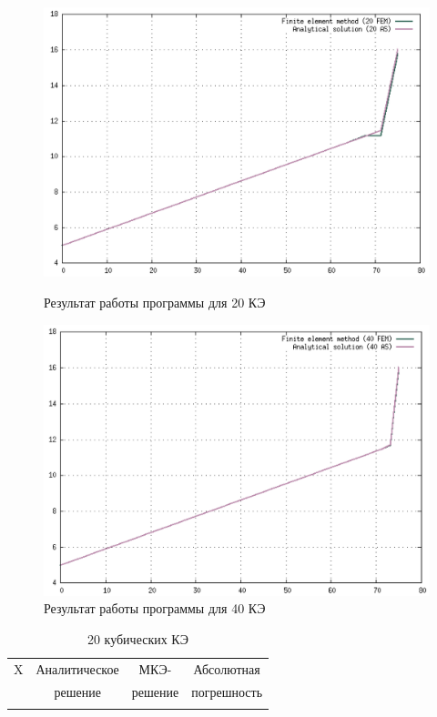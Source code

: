 \begin{figure}[!h]
    \centering
    \begin{minipage}{0.5\textwidth}
        \centering
        \includegraphics[width=1\textwidth]{labs/img/cub/20.png} %
        \caption{Результат работы программы для 20 КЭ}
        \label{c_20}
    \end{minipage}\hfill
    \begin{minipage}{0.5\textwidth}
        \centering
        \includegraphics[width=1\textwidth]{labs/img/cub/40.png} %
        \caption{Результат работы программы для 40 КЭ}
        \label{c_40}
    \end{minipage}
\end{figure}

\begin{table}[H]
\centering
\begin{tabular}{|c|c|c|c|}
\hline
X & Аналитическое & МКЭ-    & Абсолютная \\
  & решение       & решение & погрешность \\
\hline
 \\
\hline
\end{tabular}
\caption{20 кубических КЭ}
\label{table:lin_20}
\end{table}

